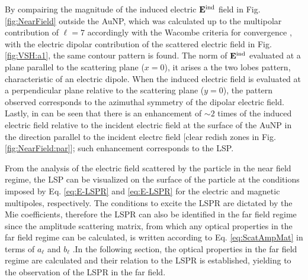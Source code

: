 By compairing the magnitude of the induced electric $\vb{E}^\text{ind}$ field in Fig. \ref{fig:NearField} outside the AuNP, which was calculated up to  the multipolar contribution of $\ell = 7$ accordingly with the Wacombe criteria for convergence \cite{bohren_absorption_1983}, with the electric dipolar contribution of the scattered electric field in Fig. \ref{fig:VSH:a1}, the same contour pattern is found. The norm of $\vb{E}^\text{ind}$ evaluated at a plane parallel to the scattering plane ($x=0$), it arises a the two lobes pattern, characteristic of an electric dipole. When the induced electric field is evaluated at a perpendicular plane relative to the scattering plane ($y = 0$), the pattern observed corresponds to the azimuthal symmetry of the dipolar electric field. Lastly, in can be seen that there is an enhancement of $\sim 2$ times of the induced electric field relative to the incident electric field at the surface of the AuNP in the direction parallel to the incident  electrc field  [clear redish zones in Fig. \ref{fig:NearField:par}]; such enhancement corresponds to the LSP.

From the analysis of the electric field scattered by the particle in the near field regime, the LSP can be visualized on the surface of the particle at the conditions imposed by Eq. \eqref{eq:E-LSPR} and \eqref{eq:E-LSPR} for the electric and magnetic multipoles, respectively. The conditions to excite the LSPR are dictated by the Mie coefficients, therefore the LSPR can also be identified in the far field regime since the amplitude scattering matrix, from which  any optical properties in the far field regime can be calculated, is written according to Eq. \eqref{eq:ScatAmpMat} in terms of $a_\ell$ and $b_\ell$ .In the following section, the optical properties in the far field regime are calculated and their relation to the LSPR is established, yielding to the observation of the LSPR in the far field.
